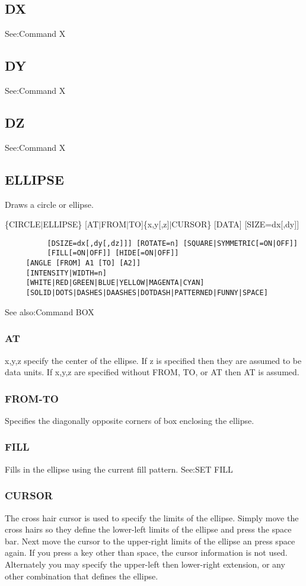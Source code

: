 \subsection{DX}
See:Command X 
\subsection{DY}
See:Command X 
\subsection{DZ}
See:Command X 
\subsection{ELLIPSE}
Draws a circle or ellipse.  

\{CIRCLE$|$ELLIPSE\} [AT$|$FROM$|$TO]\{x,y[,z]$|$CURSOR\} [DATA] [SIZE=dx[,dy]]
\begin{verbatim}
          [DSIZE=dx[,dy[,dz]]] [ROTATE=n] [SQUARE|SYMMETRIC[=ON|OFF]]
          [FILL[=ON|OFF]] [HIDE[=ON|OFF]] 
     [ANGLE [FROM] A1 [TO] [A2]] 
     [INTENSITY|WIDTH=n] 
     [WHITE|RED|GREEN|BLUE|YELLOW|MAGENTA|CYAN] 
     [SOLID|DOTS|DASHES|DAASHES|DOTDASH|PATTERNED|FUNNY|SPACE] 
\end{verbatim}
See also:Command BOX 
\subsubsection{AT}
x,y,z  specify  the center of the ellipse.  If z is specified then they
are assumed to be data units.  If x,y,z are specified without FROM, TO,
or AT then AT is assumed.  
\subsubsection{FROM-TO}
Specifies the diagonally opposite corners of box enclosing the ellipse. 
\subsubsection{FILL}
Fills in the ellipse using the current fill pattern.  See:SET FILL 
\subsubsection{CURSOR}
The  cross  hair  cursor  is used to specify the limits of the ellipse.
Simply move the cross hairs so they define the lower-left limits of the
ellipse  and  press  the  space  bar.   Next  move  the  cursor  to the
upper-right limits of the ellipse an press space again.  If you press a
key  other than space, the cursor information is not used.  Alternately
you may specify the upper-left then lower-right extension, or any other
combination that defines the ellipse.  
